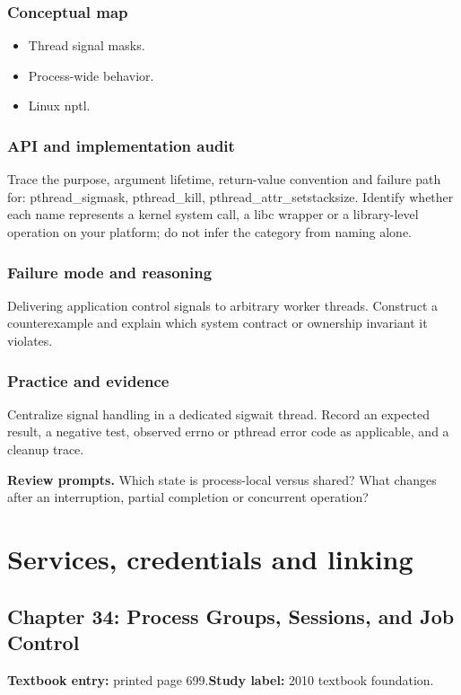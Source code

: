 \documentclass[11pt,letterpaper,oneside]{report}
\begin{document}
\subsection{Conceptual map}
\begin{itemize}
\item Thread signal masks.
\item Process-wide behavior.
\item Linux nptl.
\end{itemize}
\subsection{API and implementation audit}
Trace the purpose, argument lifetime, return-value convention and failure path for: pthread\_sigmask, pthread\_kill, pthread\_attr\_setstacksize. Identify whether each name represents a kernel system call, a libc wrapper or a library-level operation on your platform; do not infer the category from naming alone.

\subsection{Failure mode and reasoning}
Delivering application control signals to arbitrary worker threads. Construct a counterexample and explain which system contract or ownership invariant it violates.

\subsection{Practice and evidence}
Centralize signal handling in a dedicated sigwait thread. Record an expected result, a negative test, observed errno or pthread error code as applicable, and a cleanup trace.

\textbf{Review prompts.} Which state is process-local versus shared? What changes after an interruption, partial completion or concurrent operation?

\chapter{Services, credentials and linking}
\section{Chapter 34: Process Groups, Sessions, and Job Control}
\textbf{Textbook entry:} printed page 699.\quad \textbf{Study label:} 2010 textbook foundation.
\end{document}
